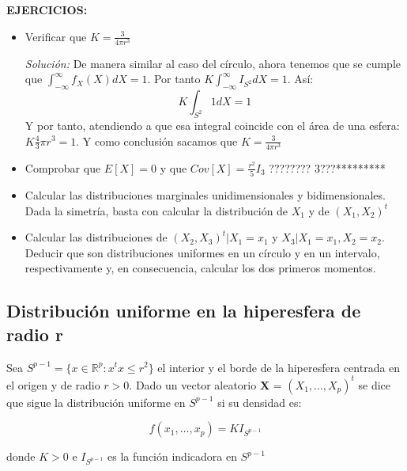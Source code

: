 \documentclass{article}
\theoremstyle{theorem-style}  %
\theoremstyle{definition}
\theoremstyle{example-style}
\begin{document}
	\textbf{EJERCICIOS:}
	\begin{itemize}
		\item Verificar que $K=\frac{3}{4\pi r^3}$
		
		\textit{Solución:} De manera similar al caso del círculo, ahora tenemos que se cumple que $\int_{-\infty}^{\infty} f_X(X) dX = 1$. Por tanto $K \int_{-\infty}^{\infty} I_{S^2} dX =1 $. Así: $$K \int_{S^2}^{}1dX = 1 $$ Y por tanto, atendiendo a que esa integral coincide con el área de una esfera: $K\frac{4}{3}\pi r^3 = 1$. Y como conclusión sacamos que $K=\frac{3}{4\pi r^3}$
		
		\item   Comprobar que $E[X]=0$ y que $Cov[X] = \frac{r^2}{5}I_3$ ???????? 3???*********
		
		\item Calcular las distribuciones marginales unidimensionales y bidimensionales. Dada la simetría, basta con calcular la distribución de $X_1$ y de $(X_1, X_2)^t$
		
		\item Calcular las distribuciones de $(X_2, X_3)^t|X_1=x_1$ y $X_3|X_1=x_1, X_2=x_2$. Deducir que son distribuciones uniformes en un círculo y en un intervalo, respectivamente y, en consecuencia, calcular los dos primeros momentos.
		
	\end{itemize}
	
	\subsection{Distribución uniforme en la hiperesfera de radio r}
	
	Sea $S^{p-1} = \{x \in \mathbb{R}^p: x^tx\leq r^2\}$ el interior y el borde de la hiperesfera centrada en el origen y de radio $r>0$. Dado un vector aleatorio \textbf{X} = $(X_1, \dots , X_p)^t$ se dice que sigue la distribución uniforme en $S^{p-1}$ si su densidad es:
	
	$$f(x_1, \dots, x_p)= KI_{S^{p-1}}$$
	
	donde $K>0$ e $I_{S^{p-1}}$ es la función indicadora en $ S^{p-1}$
	
\end{document}
